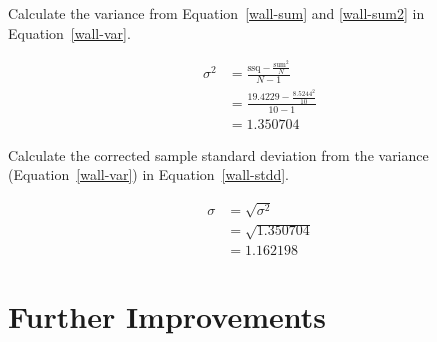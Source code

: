 \documentclass[twocolumn]{article}
\begin{document}
Calculate the variance from Equation~\ref{wall-sum} and \ref{wall-sum2} in Equation~\ref{wall-var}.

\begin{align}
\sigma^{2} &= \frac{\text{ssq} - \frac{\text{sum}^{2}}{N}}{N-1} \nonumber\\
 &= \frac{19.4229 - \frac{8.5244^2}{10}}{10-1} \nonumber\\
 &= 1.350704 \label{wall-var}
\end{align}

Calculate the corrected sample standard deviation from the variance (Equation~\ref{wall-var}) in Equation~\ref{wall-stdd}.

\begin{align}
\sigma &= \sqrt{\sigma^{2}} \nonumber\\
 &= \sqrt{1.350704} \nonumber\\
 &= 1.162198 \label{wall-stdd}
\end{align}





\section{Further Improvements}
\end{document}
